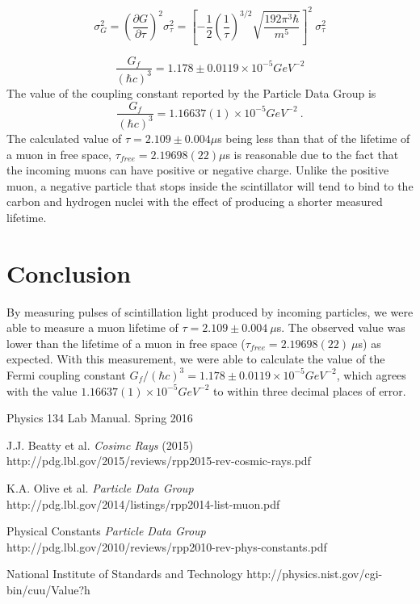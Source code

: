 \documentclass[12pt]{article}
\begin{document}
\begin{equation}
\sigma_G^2  = \left( \frac{\partial G}{\partial \tau} \right)^2\sigma_{\tau}^2 =   \left[- \frac{1}{2}\left( \frac{1}{\tau} \right)^{3/2}\sqrt{\frac{192\pi^3\hbar}{ m^5}}\right]^2\:\sigma_{\tau}^2  
\end{equation}

\begin{equation}
\frac{G_f}{(\hbar c)^3} = 1.178 \pm 0.0119 \times 10^{-5}GeV^{-2}
\end{equation}
The value of the coupling constant reported by the Particle Data Group is \cite{pdg2}
\begin{equation}
\frac{G_f}{(\hbar c)^3} = 1.166 37(1)\times 10^{-5}GeV^{-2}\:.
\end{equation}
The calculated value of $\tau = 2.109\pm 0.004\mu$s being less than that of the lifetime of a muon in free space, $\tau_{free} = 2.19698(22)\mu$s is reasonable due to the fact that the incoming muons can have positive or negative charge. Unlike the positive muon, a negative particle that stops inside the scintillator will tend to bind to the carbon and hydrogen nuclei with the effect of producing a shorter measured lifetime.
\section{Conclusion}
By measuring pulses of scintillation light produced by incoming particles, we were able to measure a muon lifetime of $\tau = 2.109\pm 0.004\:\mu$s. The observed value was  lower than the lifetime of a muon in free space ($\tau_{free} = 2.19698(22)\:\mu$s) as expected. With this measurement, we were able to calculate the value of the Fermi coupling constant $G_f /(\hbar c)^3 = 1.178 \pm 0.0119 \times 10^{-5}GeV^{-2}$, which agrees with the value $1.166 37(1)\times 10^{-5}GeV^{-2}$ to within three decimal places of error.







\newpage
\begin{thebibliography}{9}

Physics 134 Lab Manual. Spring 2016

J.J. Beatty et al. 
\textit{Cosimc Rays} (2015)\\
http://pdg.lbl.gov/2015/reviews/rpp2015-rev-cosmic-rays.pdf 

K.A. Olive et al. \textit{Particle Data Group}\\
http://pdg.lbl.gov/2014/listings/rpp2014-list-muon.pdf

Physical Constants \textit{Particle Data Group}\\
http://pdg.lbl.gov/2010/reviews/rpp2010-rev-phys-constants.pdf

National Institute of Standards and Technology
http://physics.nist.gov/cgi-bin/cuu/Value?h

\end{thebibliography}
\end{document}
